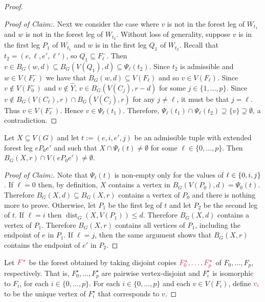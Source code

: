 \documentclass{patmorin}
\newenvironment{clmproof}{\begin{proof}[Proof of Claim:]\renewcommand{\qedsymbol}{\rule{1ex}{1ex}}}{\end{proof}}
\DeclareMathOperator{\dist}{dist}
\DeclarePairedDelimiter\set{\{}{\}}
\begin{document}
\begin{proof}
\begin{clmproof}
    Next we consider the case where $v$ is not in the forest leg of $W_{t_1}$ and $w$ is not in the forest leg of $W_{t_2}$.  Without loss of generality, suppose $v$ is in the first leg $P_1$ of $W_{t_1}$ and $w$ is in the first leg $Q_1$ of $W_{t_2}$. Recall that $t_2=(e,\ell,e',\ell')$, so $Q_1\subseteq F_\ell^-$. Then $v\in B_G(w,d)\subseteq B_G(V(Q_1),d) \subseteq \Psi_\ell(t_2)$. Since $t_2$ is admissible and $w\in V(F^-_\ell)$ we have that $B_G(w,d) \subseteq V(F_\ell)$ and so $v\in V(F_\ell)$. Since $v\not\in V(F_0^-)$ and $v\not\in \widehat{Y}$, $v\in B_G(V(C_j),r-d)$ for some $j\in\{1,\ldots,p\}$. Since $v\notin B_G(V(C_\ell),r)\cap B_G(V(C_j),r)$ for any $j\neq \ell$, it must be that $j=\ell$. Thus $v\in V(F^-_\ell)$.  Hence $v\in\Psi_\ell(t_1)$. Therefore, $\Psi_\ell(t_1)\cap\Psi_\ell(t_2)\supseteq\{v\}\supsetneq \emptyset$, a contradiction.
  \end{clmproof}


  \begin{clm}\label{hungarians_hit}
    Let $X\subseteq V(G)$ and let $t:=(e,i,e',j)$ be an admissible tuple with extended forest leg $eP_0e'$ and such that $X\cap \Psi_\ell(t)\neq\emptyset$ for some $\ell\in\{0,\ldots,p\}$.  Then $B_G(X,r)\cap V(eP_0e')\neq\emptyset$.
  \end{clm}

  \begin{clmproof}
    Note that $\Psi_{\ell}(t)$ is non-empty only for the values of $\ell\in\set{0,i,j}$. If $\ell=0$ then, by definition, $X$ contains a vertex in $B_G(V(P_0),d)=\Psi_0(t)$.  Therefore $B_G(X,d)\subseteq B_G(X,r)$ contains a vertex of $P_0$ and there is nothing more to prove. Otherwise, let $P_1$ be the first leg of $t$ and let $P_2$ be the second leg of $t$. If $\ell=i$ then $\dist_G(X,V(P_1))\le d$.  Therefore $B_G(X,d)$ contains a vertex of $P_1$.  Therefore $B_G(X,r)$ contains all vertices of $P_1$, including the endpoint of $e$ in $P_1$.  If $\ell=j$, then the same argument shows that $B_G(X,r)$ contains the endpoint of $e'$ in $P_2$.
  \end{clmproof}

  Let $\mathdefin{F^{\star}}$ be the forest obtained by taking disjoint copies $\mathdefin{F_0^\star,\ldots, F_p^\star}$ of $F_0,\ldots, F_p$, respectively.  That is,  $F_0^\star,\ldots, F_p^\star$ are pairwise vertex-disjoint and $F_i^\star$ is isomorphic to $F_i$, for each $i\in\{0,\ldots,p\}$. For each $i\in\{0,\ldots,p\}$ and each $v\in V(F_i)$, define $\mathdefin{v_i}$ to be the unique vertex of $F^\star_i$ that corresponds to $v$.


\end{proof}
\end{document}
